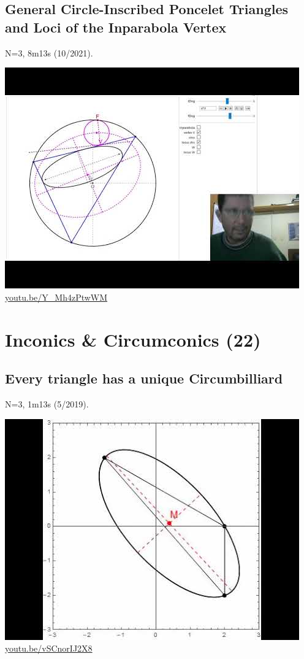 \documentclass[12pt]{amsart}
\begin{document}
\subsection{General Circle-Inscribed Poncelet Triangles and Loci of the Inparabola Vertex}
\label{vid:Y_Mh4zPtwWM}
\noindent N=3, 8m13s (10/2021). 
\begin{center}\includegraphics[width=.5\textwidth]{pics/Y_Mh4zPtwWM.jpg} \\ 
\href{https://youtu.be/Y_Mh4zPtwWM}{\url{youtu.be/Y\_Mh4zPtwWM}}\end{center}
% 


\section{Inconics \& Circumconics (22)}

\subsection{Every triangle has a unique Circumbilliard}
\label{vid:vSCnorIJ2X8}
\noindent N=3, 1m13s (5/2019). 
\begin{center}\includegraphics[width=.5\textwidth]{pics/vSCnorIJ2X8.jpg} \\ 
\href{https://youtu.be/vSCnorIJ2X8}{\url{youtu.be/vSCnorIJ2X8}}\end{center}
% 
\end{document}
